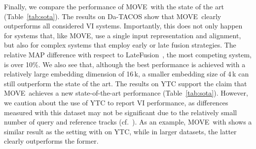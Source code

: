 \documentclass[letterpaper]{article}
\newcommand{\modelname}{MOVE}
\begin{document}
Finally, we compare the performance of \modelname\ with the state of the art (Table~\ref{tab:sota}). The results on Da-TACOS show that \modelname\ clearly outperforms all considered VI systems. Importantly, this does not only happen for systems that, like \modelname, use a single input representation and alignment, but also for complex systems that employ early or late fusion strategies. The relative MAP difference with respect to LateFusion~\cite{chen2018}, the most competing system, is over 10\%. We also see that, although the best performance is achieved with a relatively large embedding dimension of 16\,k, a smaller embedding size of 4\,k can still outperform the state of the art. The results on YTC support the claim that \modelname\ achieves a new state-of-the-art performance (Table~\ref{tab:sota}). However, we caution about the use of YTC to report VI performance, as differences measured with this dataset may not be significant due to the relatively small number of query and reference tracks (cf.~\cite{serra2011}). As an example, \modelname\ with  shows a similar result as the setting with  on YTC, while in larger datasets, the latter clearly outperforms the former.
\end{document}
